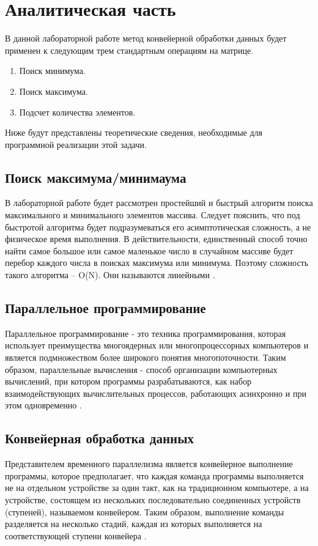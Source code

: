 \documentclass[12pt]{report}
\begin{document}
\chapter{Аналитическая часть}
 
 В данной лабораторной работе метод конвейерной обработки данных будет применен к следующим трем стандартным операциям на матрице.
\begin{enumerate}
\item Поиск минимума.
\item Поиск максимума.
\item Подсчет количества элементов.
\end{enumerate}
  Ниже будут представлены теоретические сведения, необходимые для программной реализации этой задачи.
 
 \section{Поиск максимума/минимаума} 
  В лабораторной работе будет рассмотрен простейший и быстрый алгоритм поиска максимального и минимального элементов массива. Следует пояснить, что под быстротой алгоритма будет подразумеваться его асимптотическая сложность, а не физическое время выполнения. В действительности, единственный способ точно найти самое большое или самое маленькое число в случайном массиве будет перебор каждого числа в поисках максимума или минимума. Поэтому сложность такого алгоритма – O(N). Они называются линейными \cite{MaxMin}.
  
\section{Параллельное программирование}

Параллельное программирование - это техника программирования, которая использует преимущества многоядерных или многопроцессорных компьютеров и является подмножеством более широкого понятия многопоточности. Таким образом, параллельные вычисления - способ организации компьютерных вычислений, при котором программы разрабатываются, как набор взаимодействующих вычислительных процессов, работающих асинхронно и при этом одновременно \cite{MicrosoftPar}.
  
 \section{Конвейерная обработка данных}

Представителем временного параллелизма является конвейерное выполнение программы, которое предполагает, что каждая команда программы выполняется не на отдельном устройстве за один такт, как на традиционном компьютере, а на устройстве, состоящем из нескольких последовательно соединенных устройств (ступеней), называемом конвейером. Таким образом, выполнение команды разделяется на несколько стадий, каждая из которых выполняется на соответствующей ступени конвейера \cite{Conveyer}.
\end{document}
